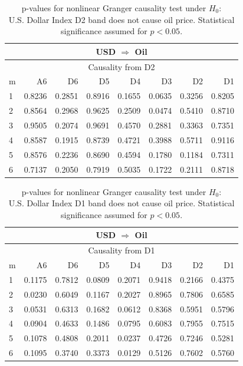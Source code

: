 %
%
\begin{table}[H]
\begin{center}
\begin{tabular}{l|r r r r r r r}
\hline\hline
\multicolumn{8}{c}{USD $\Rightarrow$ Oil}\\
\hline
\multicolumn{8}{c}{Causality from D2}\\
\hline\hline
m & A6 & D6 & D5 & D4 & D3 & D2 & D1 \\
\hline
1 & 0.8236 & 0.2851 & 0.8916 & 0.1655 & 0.0635 & 0.3256 & 0.8205 \\
2 & 0.8564 & 0.2968 & 0.9625 & 0.2509 & \cellcolor{mygreen}0.0474 & 0.5410 & 0.8710 \\
3 & 0.9505 & 0.2074 & 0.9691 & 0.4570 & 0.2881 & 0.3363 & 0.7351 \\
4 & 0.8587 & 0.1915 & 0.8739 & 0.4721 & 0.3988 & 0.5711 & 0.9116 \\
5 & 0.8576 & 0.2236 & 0.8690 & 0.4594 & 0.1780 & 0.1184 & 0.7311 \\
6 & 0.7137 & 0.2050 & 0.7919 & 0.5035 & 0.1722 & 0.2111 & 0.8718 \\
\hline\hline
\end{tabular}
\caption{p-values for nonlinear Granger causality test under $H_0$:\\
U.S. Dollar Index D2 band does not cause oil price. Statistical significance assumed for $p<0.05$.}
\end{center}
\end{table}

%
%
\begin{table}[H]
\begin{center}
\begin{tabular}{l|r r r r r r r}
\hline\hline
\multicolumn{8}{c}{USD $\Rightarrow$ Oil}\\
\hline
\multicolumn{8}{c}{Causality from D1}\\
\hline\hline
m & A6 & D6 & D5 & D4 & D3 & D2 & D1 \\
\hline
1 & 0.1175 & 0.7812 & 0.0809 & 0.2071 & 0.9418 & 0.2166 & 0.4375 \\
2 & \cellcolor{mygreen}0.0230 & 0.6049 & 0.1167 & 0.2027 & 0.8965 & 0.7806 & 0.6585 \\
3 & 0.0531 & 0.6313 & 0.1682 & 0.0612 & 0.8368 & 0.5951 & 0.5796 \\
4 & 0.0904 & 0.4633 & 0.1486 & 0.0795 & 0.6083 & 0.7955 & 0.7515 \\
5 & 0.1078 & 0.4808 & 0.2011 & \cellcolor{mygreen}0.0237 & 0.4726 & 0.7246 & 0.5281 \\
6 & 0.1095 & 0.3740 & 0.3373 & \cellcolor{mygreen}0.0129 & 0.5126 & 0.7602 & 0.5760 \\
\hline\hline
\end{tabular}
\caption{p-values for nonlinear Granger causality test under $H_0$:\\
U.S. Dollar Index D1 band does not cause oil price. Statistical significance assumed for $p<0.05$.}
\end{center}
\end{table}

